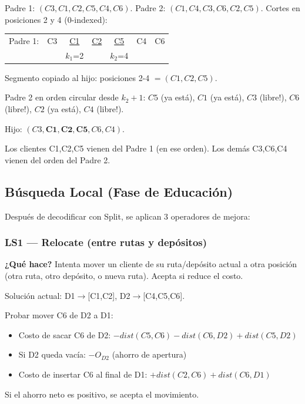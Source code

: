 \documentclass[12pt,a4paper]{article}
\begin{document}
\begin{ejemplo}
Padre 1: $(C3, C1, C2, C5, C4, C6)$. Padre 2: $(C1, C4, C3, C6, C2, C5)$.
Cortes en posiciones 2 y 4 (0-indexed):

\begin{center}
\begin{tabular}{ccccccc}
Padre 1: & C3 & \underline{C1} & \underline{C2} & \underline{C5} & C4 & C6 \\
         &    & $k_1$=2        &               & $k_2$=4        &    &    \\
\end{tabular}
\end{center}

Segmento copiado al hijo: posiciones 2-4 $= (C1, C2, C5)$.

Padre 2 en orden circular desde $k_2+1$: $C5$ (ya está), $C1$ (ya está), $C3$ (libre!), $C6$ (libre!), $C2$ (ya está), $C4$ (libre!).

Hijo: $(C3, \mathbf{C1, C2, C5}, C6, C4)$.

Los clientes C1,C2,C5 vienen del Padre 1 (en ese orden). Los demás C3,C6,C4 vienen del orden del Padre 2.
\end{ejemplo}

\subsection{Búsqueda Local (Fase de Educación)}

Después de decodificar con Split, se aplican 3 operadores de mejora:

\subsubsection{LS1 --- Relocate (entre rutas y depósitos)}

\textbf{¿Qué hace?} Intenta mover un cliente de su ruta/depósito actual a otra posición (otra ruta, otro depósito, o nueva ruta). Acepta si reduce el costo.

\begin{ejemplo}
Solución actual: D1$\to$[C1,C2], D2$\to$[C4,C5,C6].

Probar mover C6 de D2 a D1:
\begin{itemize}
\item Costo de sacar C6 de D2: $-dist(C5,C6) - dist(C6,D2) + dist(C5,D2)$
\item Si D2 queda vacía: $-O_{D2}$ (ahorro de apertura)
\item Costo de insertar C6 al final de D1: $+dist(C2,C6) + dist(C6,D1)$
\end{itemize}
Si el ahorro neto es positivo, se acepta el movimiento.
\end{ejemplo}
\end{document}
